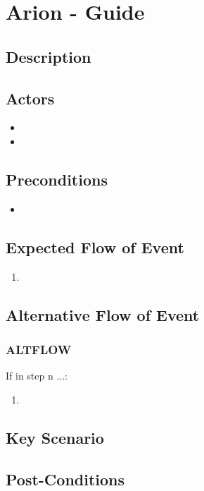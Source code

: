 \documentclass{scrreprt}
\begin{document}
\chapter*{Arion - Guide}

\section*{Description}

\section*{Actors}
\begin{itemize}
    \item 
    \item 
\end{itemize}

\section*{Preconditions}
\begin{itemize}
    \item 
\end{itemize}

\section*{Expected Flow of Event}
\begin{enumerate}[1.]
    \item 
\end{enumerate}

\section*{Alternative Flow of Event}
\subsection*{ALTFLOW}
If in step n ...:
\begin{enumerate}
    \item 
\end{enumerate}

\section*{Key Scenario}

\section*{Post-Conditions}
\end{document}
